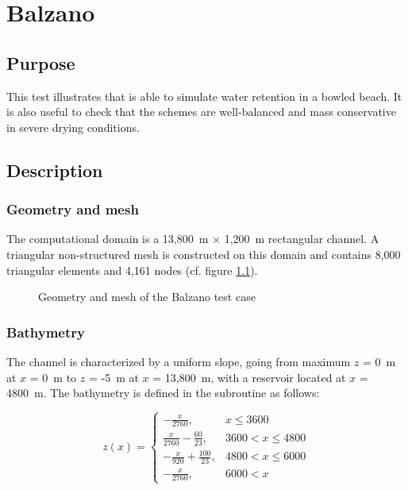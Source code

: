 
\chapter{Balzano}
%

\section{Purpose}
%
This test illustrates that  is able to simulate water retention in a bowled beach.
It is also useful to check that the schemes are well-balanced and
mass conservative in severe drying conditions.


%
\section{Description}

\subsection{Geometry and mesh}
\label{subsection:balzano:bathy}

The computational domain is a 13,800~m $\times$ 1,200~m rectangular channel.
A triangular non-structured mesh is constructed on this domain and contains
8,000 triangular elements and 4,161 nodes (cf. figure \ref{fig:balzano:mesh}).

\begin{figure}[H]
  \centering
  \caption{Geometry and mesh of the Balzano test case}\label{fig:balzano:mesh}
\end{figure}

\subsection{Bathymetry}

The channel is characterized by a uniform slope,
going from maximum $z$ = 0~m at $x$ = 0~m to $z$ = -5~m at $x$ = 13,800~m, with a
reservoir located at $x$ = 4800~m.
The bathymetry is defined in the  subroutine as follows:

\begin{equation}
   z(x) =
    \begin{cases}
      -\frac{x}{2760} ,& x \leq 3600\\
       \frac{x}{2760} - \frac{60}{23} ,&  3600 < x \leq 4800\\
       -\frac{x}{920} + \frac{100}{23} ,& 4800 < x \leq 6000 \\
       -\frac{x}{2760} ,& 6000 < x
    \end{cases}
    \label{eq:balzano:analytical}
\end{equation}

